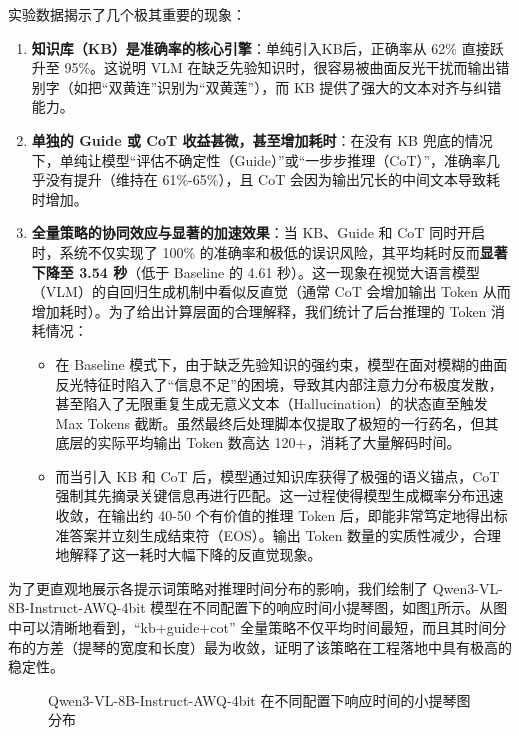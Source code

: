 \documentclass[11pt,a4paper]{ctexart}
\begin{document}
实验数据揭示了几个极其重要的现象：
\begin{enumerate}
    \item \textbf{知识库（KB）是准确率的核心引擎}：单纯引入KB后，正确率从 62\% 直接跃升至 95\%。这说明 VLM 在缺乏先验知识时，很容易被曲面反光干扰而输出错别字（如把“双黄连”识别为“双黄莲”），而 KB 提供了强大的文本对齐与纠错能力。
    \item \textbf{单独的 Guide 或 CoT 收益甚微，甚至增加耗时}：在没有 KB 兜底的情况下，单纯让模型“评估不确定性（Guide）”或“一步步推理（CoT）”，准确率几乎没有提升（维持在 61\%-65\%），且 CoT 会因为输出冗长的中间文本导致耗时增加。
    \item \textbf{全量策略的协同效应与显著的加速效果}：当 KB、Guide 和 CoT 同时开启时，系统不仅实现了 100\% 的准确率和极低的误识风险，其平均耗时反而\textbf{显著下降至 3.54 秒}（低于 Baseline 的 4.61 秒）。这一现象在视觉大语言模型（VLM）的自回归生成机制中看似反直觉（通常 CoT 会增加输出 Token 从而增加耗时）。为了给出计算层面的合理解释，我们统计了后台推理的 Token 消耗情况：
    \begin{itemize}
        \item 在 Baseline 模式下，由于缺乏先验知识的强约束，模型在面对模糊的曲面反光特征时陷入了“信息不足”的困境，导致其内部注意力分布极度发散，甚至陷入了无限重复生成无意义文本（Hallucination）的状态直至触发 Max Tokens 截断。虽然最终后处理脚本仅提取了极短的一行药名，但其底层的实际平均输出 Token 数高达 120+，消耗了大量解码时间。
        \item 而当引入 KB 和 CoT 后，模型通过知识库获得了极强的语义锚点，CoT 强制其先摘录关键信息再进行匹配。这一过程使得模型生成概率分布迅速收敛，在输出约 40-50 个有价值的推理 Token 后，即能非常笃定地得出标准答案并立刻生成结束符（EOS）。输出 Token 数量的实质性减少，合理地解释了这一耗时大幅下降的反直觉现象。
    \end{itemize}
\end{enumerate}

为了更直观地展示各提示词策略对推理时间分布的影响，我们绘制了 Qwen3-VL-8B-Instruct-AWQ-4bit 模型在不同配置下的响应时间小提琴图，如图\ref{fig:violin}所示。从图中可以清晰地看到，“kb+guide+cot” 全量策略不仅平均时间最短，而且其时间分布的方差（提琴的宽度和长度）最为收敛，证明了该策略在工程落地中具有极高的稳定性。

\begin{figure}[h]
\centering
\vspace{3cm} %
\caption{Qwen3-VL-8B-Instruct-AWQ-4bit 在不同配置下响应时间的小提琴图分布}
\label{fig:violin}
\end{figure}
\end{document}
